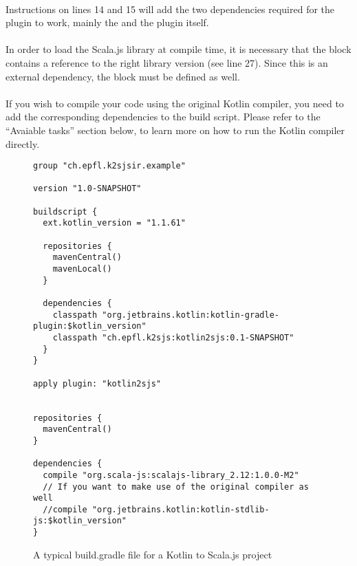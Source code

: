 \paragraph{} Instructions on lines 14 and 15 will add the two dependencies required for the plugin 
to work, mainly the  and the  plugin itself.

\paragraph{} In order to load the Scala.js library at compile time, it is necessary 
that the  block contains a reference to the right library version 
(see line 27). Since this is an external dependency, the  block must be 
defined as well.

\paragraph{} If you wish to compile your code using the original Kotlin compiler, you need to add the corresponding dependencies to the build script. Please refer to the \enquote{Avaiable tasks} section below, to learn more on how to run the Kotlin compiler directly.

\begin{figure}[h!]
\begin{verbatim}
group "ch.epfl.k2sjsir.example"

version "1.0-SNAPSHOT"

buildscript {
  ext.kotlin_version = "1.1.61"
    
  repositories {
    mavenCentral()
    mavenLocal()
  }

  dependencies {
    classpath "org.jetbrains.kotlin:kotlin-gradle-plugin:$kotlin_version"
    classpath "ch.epfl.k2sjs:kotlin2sjs:0.1-SNAPSHOT"
  }
}

apply plugin: "kotlin2sjs"


repositories {
  mavenCentral()
}

dependencies {  
  compile "org.scala-js:scalajs-library_2.12:1.0.0-M2"
  // If you want to make use of the original compiler as well
  //compile "org.jetbrains.kotlin:kotlin-stdlib-js:$kotlin_version"
}
\end{verbatim}
  \caption{A typical build.gradle file for a Kotlin to Scala.js project}
  \label{plugin_build_file}
\end{figure}



